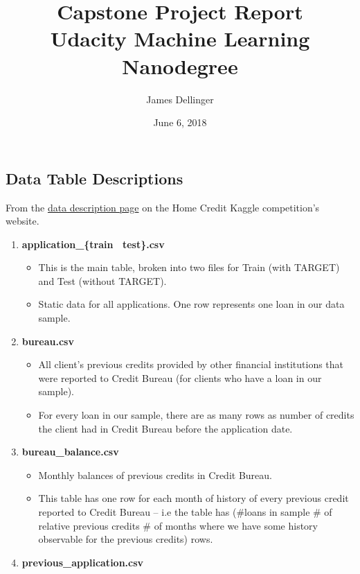 \documentclass[12pt, letterpaper]{article}
\title{Capstone Project Report\\[8pt]
\normalsize{Udacity Machine Learning Nanodegree}}
\date{June 6, 2018}
\author{James Dellinger}
\begin{document}
\maketitle



\begin{appendices}
\section{Data Table Descriptions}
\label{appendix:datatabledescriptions}
From the \href{https://www.kaggle.com/c/home-credit-default-risk/data}{data description page} on the Home Credit Kaggle competition's website\cite{kagglehomecreditcompetitiondata}.
\begin{enumerate}
  \item \textbf{application_\{train \textbar~test\}.csv}
    \begin{itemize}
      \item This is the main table, broken into two files for Train (with TARGET) and Test (without TARGET).
      \item Static data for all applications. One row represents one loan in our data sample.
    \end{itemize}
  \item \textbf{bureau.csv}
    \begin{itemize}
      \item All client's previous credits provided by other financial institutions that were reported to Credit Bureau (for clients who have a loan in our sample).
      \item For every loan in our sample, there are as many rows as number of credits the client had in Credit Bureau before the application date.
    \end{itemize}
  \item \textbf{bureau_balance.csv}
    \begin{itemize}
      \item Monthly balances of previous credits in Credit Bureau.
      \item This table has one row for each month of history of every previous credit reported to Credit Bureau – i.e the table has (\#loans in sample \# of relative previous credits \# of months where we have some history observable for the previous credits) rows.
    \end{itemize}
  \item \textbf{previous_application.csv}
    \begin{itemize}

\end{itemize}
\end{enumerate}
\end{appendices}
\end{document}
